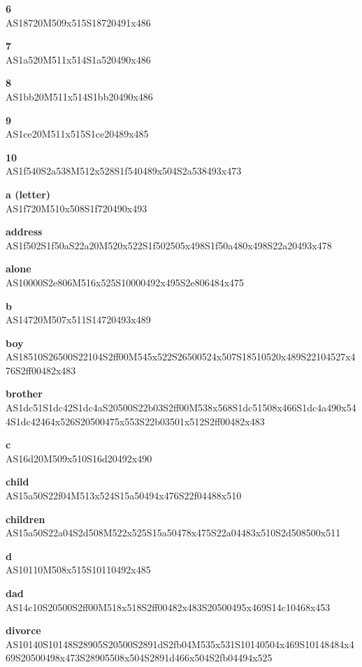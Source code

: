\documentclass{article}
\begin{document}
\begin{glossary}

\textbf{6}\\
AS18720M509x515S18720491x486

\textbf{7}\\
AS1a520M511x514S1a520490x486

\textbf{8}\\
AS1bb20M511x514S1bb20490x486

\textbf{9}\\
AS1ce20M511x515S1ce20489x485

\textbf{10}\\
AS1f540S2a538M512x528S1f540489x504S2a538493x473

\textbf{a (letter)}\\
AS1f720M510x508S1f720490x493

\textbf{address}\\
AS1f502S1f50aS22a20M520x522S1f502505x498S1f50a480x498S22a20493x478

\textbf{alone}\\
AS10000S2e806M516x525S10000492x495S2e806484x475

\textbf{b}\\
AS14720M507x511S14720493x489

\textbf{boy}\\
AS18510S26500S22104S2ff00M545x522S26500524x507S18510520x489S22104527x476S2ff00482x483

\textbf{brother}\\
AS1dc51S1dc42S1dc4aS20500S22b03S2ff00M538x568S1dc51508x466S1dc4a490x544S1dc42464x526S20500475x553S22b03501x512S2ff00482x483

\textbf{c}\\
AS16d20M509x510S16d20492x490

\textbf{child}\\
AS15a50S22f04M513x524S15a50494x476S22f04488x510

\textbf{children}\\
AS15a50S22a04S2d508M522x525S15a50478x475S22a04483x510S2d508500x511

\textbf{d}\\
AS10110M508x515S10110492x485

\textbf{dad}\\
AS14c10S20500S2ff00M518x518S2ff00482x483S20500495x469S14c10468x453

\textbf{divorce}\\
AS10140S10148S28905S20500S2891dS2fb04M535x531S10140504x469S10148484x469S20500498x473S28905508x504S2891d466x504S2fb04494x525


\end{glossary}
\end{document}
